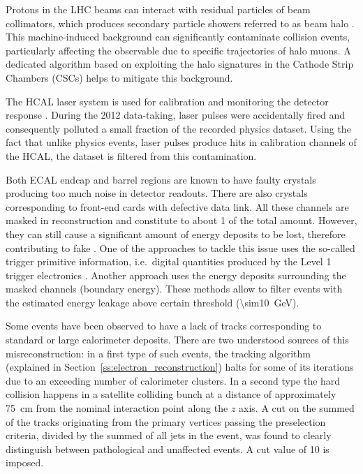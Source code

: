 \begin{description}[wide=\parindent]
	\item[CSC beam halo filter.]
	Protons in the LHC beams can interact with residual particles of beam collimators, which produces secondary particle
	showers referred to as beam halo \autocite{beam_halo_CMS}. This machine-induced background can significantly
	contaminate collision events, particularly affecting the \MET observable due to specific trajectories of halo muons.
	A dedicated algorithm based on exploiting the halo signatures in the Cathode Strip Chambers (CSCs) helps to mitigate
	this background.

	\item[HCAL laser filter.] The HCAL laser system is used for calibration and monitoring the detector response
	\autocite{CMS_TDR1}. During the 2012 data-taking, laser pulses were accidentally fired and consequently polluted a
	small fraction of the recorded physics dataset. Using the fact that unlike physics events, laser pulses produce hits
	in calibration channels of the HCAL, the dataset is filtered from this contamination.

	\item[ECAL dead cell filter.] Both ECAL endcap and barrel regions are known to have faulty crystals producing too
	much noise in detector readouts. There are also crystals corresponding to front-end cards with defective data link.
	All these channels are masked in reconstruction and constitute to about \SI{1}{\pc} of the total amount. However,
	they can still cause a significant amount of energy deposits to be lost, therefore contributing to fake \MET. One of
	the approaches to tackle this issue uses the so-called trigger primitive information, i.e.\ digital quantities
	produced by the Level 1 trigger electronics \autocite{CMS_L1_Trigger_TDR}. Another approach uses the energy deposits
	surrounding the masked channels (boundary energy). These methods allow to filter events with the estimated energy
	leakage above certain threshold (\SI{\sim10}{\GeV}).

	\item[Tracking failure filter.] Some events have been observed to have a lack of tracks corresponding to standard or
	large calorimeter deposits. There are two understood sources of this misreconstruction: in a first type of such
	events, the tracking algorithm (explained in Section~\ref{ss:electron_reconstruction}) halts for some of its
	iterations due to an exceeding number of calorimeter clusters. In a second type the hard collision happens in a
	satellite colliding bunch at a distance of approximately \SI{75}{\cm} from the nominal interaction point along the
	$z$ axis. A cut on the summed \pt of the tracks originating from the primary vertices passing the preselection
	criteria, divided by the summed \pt of all jets in the event, was found to clearly distinguish between pathological
	and unaffected events. A cut value of \SI{10}{\pc} is imposed.


\end{description}
